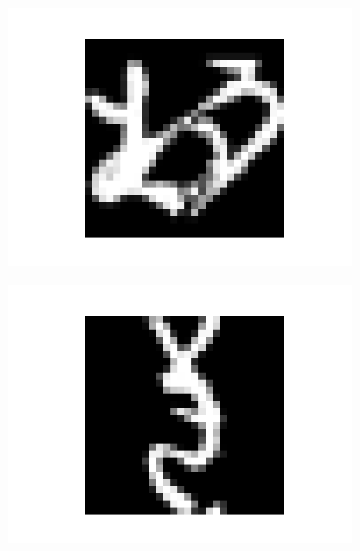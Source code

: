 \documentclass[14pt,a4paper]{extarticle}
\begin{document}
\begin{figure}[htb]
\begin{subfigure}[b]{0.3\textwidth}
    \includegraphics[width=\textwidth]{../res/kmnist/sample_2.png}
    \label{fig:kmnist_sample_2}
  \end{subfigure}
  \hfill
  \begin{subfigure}[b]{0.3\textwidth}
    \includegraphics[width=\textwidth]{../res/kmnist/sample_3.png}
    \label{fig:kmnist_sample_3}
  \end{subfigure}
  \hfill
  \begin{subfigure}[b]{0.3\textwidth}

\end{subfigure}
\end{figure}
\end{document}
